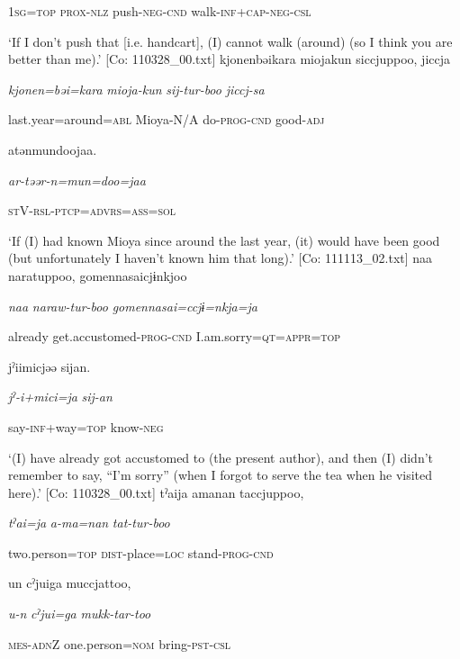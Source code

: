       1\textsc{sg}=\textsc{top}  \textsc{prox}-\textsc{nlz}  push-\textsc{neg}-\textsc{cnd}  walk-\textsc{inf}+\textsc{cap}-\textsc{neg}-\textsc{csl}

\glt ‘If I don’t push that [i.e. handcart], (I) cannot walk (around) (so I think you are better than me).’ [Co: 110328\_00.txt]
\ex {\TM}
\glll  {\textbar}kjonen{\textbar}bəikara  mioja{\textbar}kun{\textbar}  siccjuppoo,  jiccja

      \textit{kjonen=bəi=kara}  \textit{mioja-kun}  \textit{sij-tur-boo}  \textit{jiccj-sa}

      last.year=around=\textsc{abl}  Mioya-N/A  do-\textsc{prog}-\textsc{cnd}  good-\textsc{adj}

      atənmundoojaa.

      \textit{ar-təər-n=mun=doo=jaa}

      \textsc{st}V-\textsc{rsl}-\textsc{ptcp}=\textsc{advrs}=\textsc{ass}=\textsc{sol}

\glt ‘If (I) had known Mioya since around the last year, (it) would have been good (but unfortunately I haven’t known him that long).’ [Co: 111113\_02.txt]
\ex {\TM}
\glll  naa  naratuppoo,  {\textbar}gomennasai{\textbar}cjɨnkjoo

      \textit{naa}  \textit{naraw-tur-boo}  \textit{gomennasai=ccjɨ=nkja=ja}

      already  get.accustomed-\textsc{prog}-\textsc{cnd}  I.am.sorry=\textsc{qt}=\textsc{appr}=\textsc{top}

      jˀiimicjəə  sijan.

      \textit{jˀ-i+mici=ja}  \textit{sij-an}

      say-\textsc{inf}+way=\textsc{top}  know-\textsc{neg}

\glt ‘(I) have already got accustomed to (the present author), and then (I) didn’t remember to say, “I’m sorry” (when I forgot to serve the tea when he visited here).’ [Co: 110328\_00.txt]
\ex {\TM}
\glll  tˀaija  amanan  taccjuppoo,

      \textit{tˀai=ja}  \textit{a-ma=nan}  \textit{tat-tur-boo}

      two.person=\textsc{top}  \textsc{dist}-place=\textsc{loc}  stand-\textsc{prog}-\textsc{cnd}

      un  cˀjuiga  muccjattoo,

      \textit{u-n}  \textit{cˀjui=ga}  \textit{mukk-tar-too}

      \textsc{mes}-\textsc{adn}Z  one.person=\textsc{nom}  bring-\textsc{pst}-\textsc{csl}

